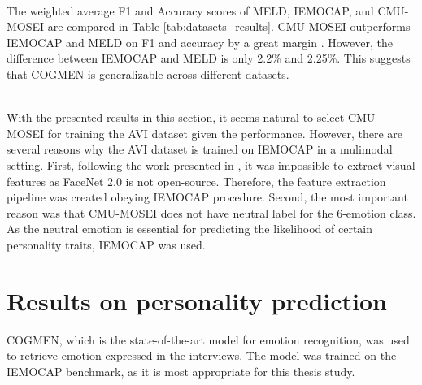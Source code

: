 %
\\
The weighted average F1 and Accuracy scores of MELD, IEMOCAP, and CMU-MOSEI are compared in Table \ref{tab:datasets_results}. CMU-MOSEI outperforms IEMOCAP and MELD on F1 and accuracy by a great margin \cite{HP_Advanced}. However, the difference between IEMOCAP and MELD is only 2.2\% and 2.25\%. This suggests that COGMEN is generalizable across different datasets. 
%
\begin{table}[h]
\caption{Comparison of COGMEN performed on the three datasets.}
\centering
{}
\label{tab:datasets_results}
\end{table}
%
\\
With the presented results in this section, it seems natural to select CMU-MOSEI for training the AVI dataset given the performance. However, there are several reasons why the AVI dataset is trained on IEMOCAP in a mulimodal setting. First, following the work presented in \cite{cmu-mosei_zadeh2018multimodal}, it was impossible to extract visual features as FaceNet 2.0 is not open-source. Therefore, the feature extraction pipeline was created obeying IEMOCAP procedure. Second, the most important reason was that CMU-MOSEI does not have neutral label for the 6-emotion class. As the neutral emotion is essential for predicting the likelihood of certain personality traits, IEMOCAP was used. 


\section{Results on personality prediction}
\label{sec:results_personality}
COGMEN, which is the state-of-the-art model for emotion recognition, was used to retrieve emotion expressed in the interviews. The model was trained on the IEMOCAP benchmark, as it is most appropriate for this thesis study. \\

